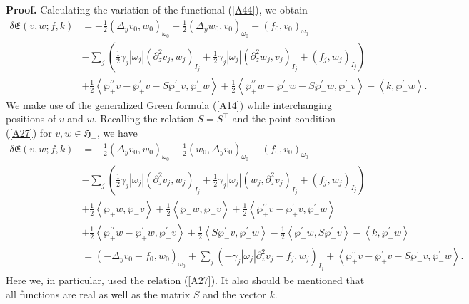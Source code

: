\documentclass[11pt]{article}%
\numberwithin{equation}{section}
\begin{document}
\textbf{Proof.} Calculating the variation of the functional (\ref{A44}), we
obtain%
\begin{align*}
\delta\mathfrak{E}(v,w;f,k)  &  =-\frac{1}{2}(\Delta_{y}v_{0},w_{0}%
)_{\omega_{0}}-\frac{1}{2}(\Delta_{y}w_{0},v_{0})_{\omega_{0}}-(f_{0}%
,v_{0})_{\omega_{0}}\\
&  -\sum\nolimits_{j}\left(  \frac{1}{2}\gamma_{j}|\omega_{j}|(\partial
_{z}^{2}v_{j},w_{j})_{I_{j}}+\frac{1}{2}\gamma_{j}|\omega_{j}|(\partial
_{z}^{2}w_{j},v_{j})_{I_{j}}+(f_{j},w_{j})_{I_{j}}\right) \\
&  +\frac{1}{2}\left\langle \wp_{+}^{\prime\prime}v-\wp_{+}^{\prime}v-S\wp
_{-}^{\prime}v,\wp_{-}^{\prime}w\right\rangle +\frac{1}{2}\left\langle \wp
_{+}^{\prime\prime}w-\wp_{+}^{\prime}w-S\wp_{-}^{\prime}w,\wp_{-}^{\prime
}v\right\rangle -\left\langle k,\wp_{-}^{\prime}w\right\rangle .
\end{align*}
We make use of the generalized Green formula (\ref{A14}) while interchanging
positions of $v$ and $w$. Recalling the relation $S=S^{\top}$ and the point
condition (\ref{A27}) for $v,w\in\mathfrak{H}_{-}$, we have%
\begin{align}
\delta\mathfrak{E}(v,w;f,k)  &  =-\frac{1}{2}(\Delta_{y}v_{0},w_{0}%
)_{\omega_{0}}-\frac{1}{2}(w_{0},\Delta_{y}v_{0})_{\omega_{0}}-(f_{0}%
,v_{0})_{\omega_{0}}\label{A45}\\
&  -\sum\nolimits_{j}\left(  \frac{1}{2}\gamma_{j}|\omega_{j}|(\partial
_{z}^{2}v_{j},w_{j})_{I_{j}}+\frac{1}{2}\gamma_{j}|\omega_{j}|(w_{j}%
,\partial_{z}^{2}v_{j})_{I_{j}}+(f_{j},w_{j})_{I_{j}}\right) \nonumber\\
&  +\frac{1}{2}\left\langle \wp_{+}w,\wp_{-}v\right\rangle +\frac{1}%
{2}\left\langle \wp_{-}w,\wp_{+}v\right\rangle +\frac{1}{2}\left\langle
\wp_{+}^{\prime\prime}v-\wp_{+}^{\prime}v,\wp_{-}^{\prime}w\right\rangle
\nonumber\\
&  +\frac{1}{2}\left\langle \wp_{+}^{\prime\prime}w-\wp_{+}^{\prime}w,\wp
_{-}^{\prime}v\right\rangle +\frac{1}{2}\left\langle S\wp_{-}^{\prime}%
v,\wp_{-}^{\prime}w\right\rangle -\frac{1}{2}\left\langle \wp_{-}^{\prime
}w,S\wp_{-}^{\prime}v\right\rangle -\left\langle k,\wp_{-}^{\prime
}w\right\rangle \nonumber\\
&  =(-\Delta_{y}v_{0}-f_{0},w_{0})_{\omega_{0}}+\sum\nolimits_{j}(-\gamma
_{j}|\omega_{j}|\partial_{z}^{2}v_{j}-f_{j},w_{j})_{I_{j}}+\left\langle
\wp_{+}^{\prime\prime}v-\wp_{+}^{\prime}v-S\wp_{-}^{\prime}v,\wp_{-}^{\prime
}w\right\rangle .\nonumber
\end{align}
Here we, in particular, used the relation (\ref{A27}). It also should be
mentioned that all functions are real as well as the matrix $S$ and the vector
$k$.
\end{document}
